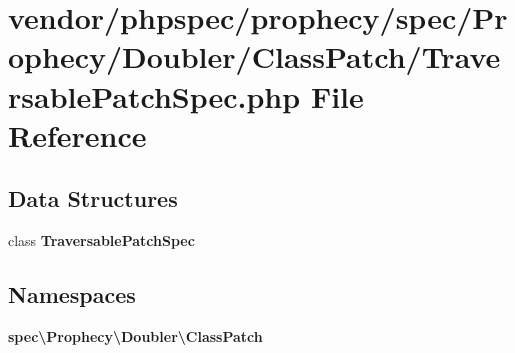 \section{vendor/phpspec/prophecy/spec/\+Prophecy/\+Doubler/\+Class\+Patch/\+Traversable\+Patch\+Spec.php File Reference}
\label{_traversable_patch_spec_8php}
\subsection*{Data Structures}
\begin{DoxyCompactItemize}
\item 
class {\bf Traversable\+Patch\+Spec}
\end{DoxyCompactItemize}
\subsection*{Namespaces}
\begin{DoxyCompactItemize}
\item 
 {\bf spec\textbackslash{}\+Prophecy\textbackslash{}\+Doubler\textbackslash{}\+Class\+Patch}
\end{DoxyCompactItemize}
